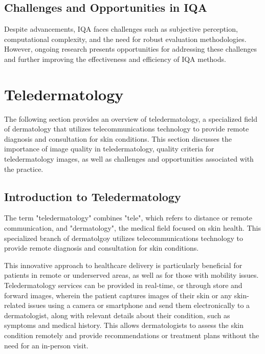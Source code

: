 \subsection{Challenges and Opportunities in IQA}
\label{sub:ChallengesOpportunitiesIQA}
Despite advancements, IQA faces challenges such as subjective perception, computational complexity, and the need for robust evaluation methodologies. However, ongoing research presents opportunities for addressing these challenges and further improving the effectiveness and efficiency of IQA methods. \par
\vspace{\baselineskip}
\noindent


\section{Teledermatology}
\label{sec:Teledermatology}
The following section provides an overview of teledermatology, a specialized field of dermatology that utilizes telecommunications technology to provide remote diagnosis and consultation for skin conditions. This section discusses the importance of image quality in teledermatology, quality criteria for teledermatology images, as well as challenges and opportunities associated with the practice. \par
\vspace{\baselineskip}
\noindent

\subsection{Introduction to Teledermatology}
\label{sub:IntroductionTeledermatology}
The term "teledermatology" combines "tele", which refers to distance or remote communication, and "dermatology", the medical field focused on skin health. This specialized branch of dermatolgoy utilizes telecommunications technology to provide remote diagnosis and consultation for skin conditions.\par
\vspace{\baselineskip}
\noindent
This innovative approach to healthcare delivery is particularly beneficial for patients in remote or underserved areas, as well as for those with mobility issues. Teledermatology services can be provided in real-time, or through store and forward images, wherein the patient captures images of their skin or any skin-related issues using a camera or smartphone and send them electronically to a dermatologist, along with relevant details about their condition, such as symptoms and medical history. This allows dermatologists to assess the skin condition remotely and provide recommendations or treatment plans without the need for an in-person visit.\par

